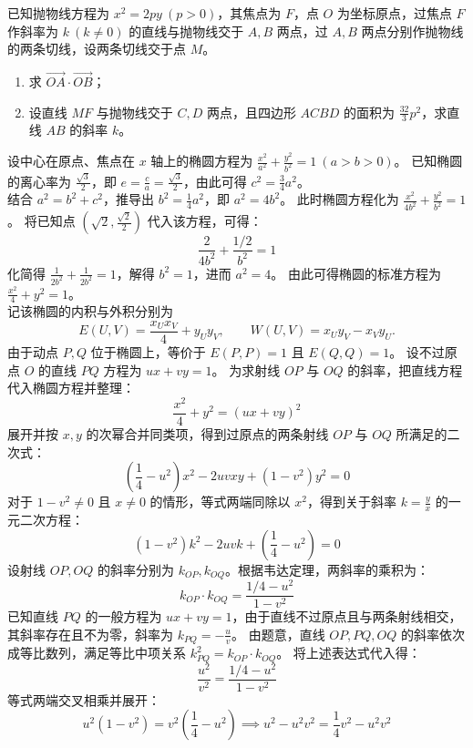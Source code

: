 \begin{example}
已知抛物线方程为 \(x^2 = 2py\ (p>0)\)，其焦点为 \(F\)，点 \(O\) 为坐标原点，过焦点 \(F\) 作斜率为 \(k\ (k \neq 0)\) 的直线与抛物线交于 \(A,B\) 两点，过 \(A,B\) 两点分别作抛物线的两条切线，设两条切线交于点 \(M\)。
\begin{enumerate}
    \item[(1)] 求 \(\overrightarrow{OA} \cdot \overrightarrow{OB}\)；
    \item[(2)] 设直线 \(MF\) 与抛物线交于 \(C,D\) 两点，且四边形 \(ACBD\) 的面积为 \(\frac{32}{3}p^2\)，求直线 \(AB\) 的斜率 \(k\)。
\end{enumerate}
\end{example}
\begin{solution}
设中心在原点、焦点在 $x$ 轴上的椭圆方程为 $\frac{x^2}{a^2} + \frac{y^2}{b^2} = 1\ (a > b > 0)$。
已知椭圆的离心率为 $\frac{\sqrt{3}}{2}$，即 $e = \frac{c}{a} = \frac{\sqrt{3}}{2}$，由此可得 $c^2 = \frac{3}{4}a^2$。\\
结合 $a^2 = b^2 + c^2$，推导出 $b^2 = \frac{1}{4}a^2$，即 $a^2 = 4b^2$。
此时椭圆方程化为 $\frac{x^2}{4b^2} + \frac{y^2}{b^2} = 1$。
将已知点 $\left(\sqrt{2}, \frac{\sqrt{2}}{2}\right)$ 代入该方程，可得：
$$ \frac{2}{4b^2} + \frac{1/2}{b^2} = 1 $$
化简得 $\frac{1}{2b^2} + \frac{1}{2b^2} = 1$，解得 $b^2 = 1$，进而 $a^2 = 4$。
由此可得椭圆的标准方程为 $\frac{x^2}{4} + y^2 = 1$。\\
记该椭圆的内积与外积分别为
\[ E(U, V) = \frac{x_U x_V}{4} + y_U y_V, \qquad W(U, V) = x_U y_V - x_V y_U. \]
由于动点 $P, Q$ 位于椭圆上，等价于 $E(P, P) = 1$ 且 $E(Q, Q) = 1$。
设不过原点 $O$ 的直线 $PQ$ 方程为 $ux + vy = 1$。
为求射线 $OP$ 与 $OQ$ 的斜率，把直线方程代入椭圆方程并整理：
$$ \frac{x^2}{4} + y^2 = (ux + vy)^2 $$
展开并按 $x, y$ 的次幂合并同类项，得到过原点的两条射线 $OP$ 与 $OQ$ 所满足的二次式：
$$ \left(\frac{1}{4} - u^2\right)x^2 - 2uvxy + (1 - v^2)y^2 = 0 $$
对于 $1 - v^2 \neq 0$ 且 $x \neq 0$ 的情形，等式两端同除以 $x^2$，得到关于斜率 $k = \frac{y}{x}$ 的一元二次方程：
$$ (1 - v^2)k^2 - 2uvk + \left(\frac{1}{4} - u^2\right) = 0 $$
设射线 $OP, OQ$ 的斜率分别为 $k_{OP}, k_{OQ}$。根据韦达定理，两斜率的乘积为：
$$ k_{OP} \cdot k_{OQ} = \frac{1/4 - u^2}{1 - v^2} $$
已知直线 $PQ$ 的一般方程为 $ux + vy = 1$，由于直线不过原点且与两条射线相交，其斜率存在且不为零，斜率为 $k_{PQ} = -\frac{u}{v}$。
由题意，直线 $OP, PQ, OQ$ 的斜率依次成等比数列，满足等比中项关系 $k_{PQ}^2 = k_{OP} \cdot k_{OQ}$。
将上述表达式代入得：
$$ \frac{u^2}{v^2} = \frac{1/4 - u^2}{1 - v^2} $$
等式两端交叉相乘并展开：
$$ u^2(1 - v^2) = v^2\left(\frac{1}{4} - u^2\right) \implies u^2 - u^2 v^2 = \frac{1}{4}v^2 - u^2 v^2 $$

\end{solution}
